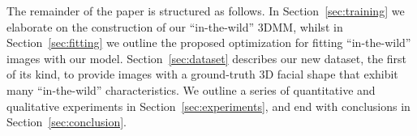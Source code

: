 The remainder of the paper is structured as follows.
In Section~\ref{sec:training} we elaborate on the construction of our ``in-the-wild'' 3DMM,
whilst in Section~\ref{sec:fitting} we outline the proposed optimization for fitting
``in-the-wild'' images with our model. Section~\ref{sec:dataset} describes our
new dataset, the first of its kind, to provide images with a ground-truth 3D facial shape that exhibit many ``in-the-wild'' characteristics. We outline a series of quantitative and qualitative experiments in Section~\ref{sec:experiments}, and end with conclusions in Section~\ref{sec:conclusion}.


%

%





%


%
%

%
%
%
%

%


%
%

%
%


%
%
%
